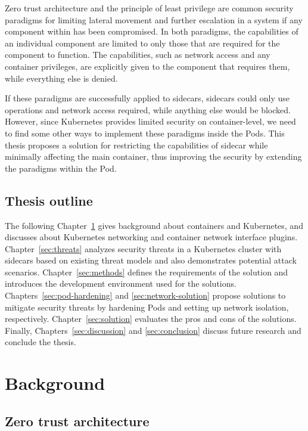 \documentclass[english, 12pt, a4paper, sci, utf8, a-2b, online]{aaltothesis}
\begin{document}
Zero trust architecture and the principle of least privilege are common security paradigms for limiting lateral movement and further escalation in a system if any component within has been compromised.
In both paradigms, the capabilities of an individual component are limited to only those that are required for the component to function.
The capabilities, such as network access and any container privileges, are explicitly given to the component that requires them, while everything else is denied.

If these paradigms are successfully applied to sidecars, sidecars could only use operations and network access required, while anything else would be blocked.
However, since Kubernetes provides limited security on container-level, we need to find some other ways to implement these paradigms inside the Pods.
This thesis proposes a solution for restricting the capabilities of sidecar while minimally affecting the main container, thus improving the security by extending the paradigms within the Pod.

\subsection{Thesis outline}

The following Chapter~\ref{sec:bg} gives background about containers and Kubernetes, and discusses about Kubernetes networking and container network interface plugins.
Chapter~\ref{sec:threats} analyzes security threats in a Kubernetes cluster with sidecars based on existing threat models and also demonstrates potential attack scenarios.
Chapter~\ref{sec:methods} defines the requirements of the solution and introduces the development environment used for the solutions.
Chapters~\ref{sec:pod-hardening} and \ref{sec:network-solution} propose solutions to mitigate security threats by hardening Pods and setting up network isolation, respectively.
Chapter~\ref{sec:solution} evaluates the pros and cons of the solutions.
Finally, Chapters~\ref{sec:discussion} and \ref{sec:conclusion} discuss future research and conclude the thesis.

\clearpage

\section{Background} \label{sec:bg}

\subsection{Zero trust architecture}
\end{document}
